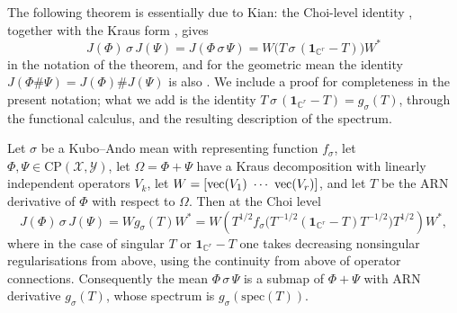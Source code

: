 The following theorem is essentially due to Kian: the Choi-level identity \cite[Theorem~5.1]{kian2026relative}, together with the Kraus form \cite[Proposition~3.13]{kian2026relative}, gives
\[
J(\Phi)\,\sigma\,J(\Psi)=J(\Phi\,\sigma\,\Psi)=W\big(T\,\sigma\,(\mathbf{1}_{\mathbb{C}^r}-T)\big)W^*
\]
in the notation of the theorem, and for the geometric mean the identity $J(\Phi\#\Psi)=J(\Phi)\#J(\Psi)$ is also \cite[Proposition~4.1]{Okayasu2026}. We include a proof for completeness in the present notation; what we add is the identity $T\,\sigma\,(\mathbf{1}_{\mathbb{C}^r}-T)=g_\sigma(T)$, through the functional calculus, and the resulting description of the spectrum.
 
\begin{theorem}\label{cont:fundamental principle}
    Let $\sigma$ be a Kubo--Ando mean with representing function $f_\sigma$, let $\Phi,\Psi\in\mathrm{CP}(\mathcal{X},\mathcal{Y})$, let $\Omega=\Phi+\Psi$ have a Kraus decomposition with linearly independent operators $V_k$, let $W=[\vectorise(V_1)\ \cdots\ \vectorise(V_r)]$, and let $T$ be the ARN derivative of $\Phi$ with respect to $\Omega$. Then at the Choi level
    \[
        J(\Phi)\,\sigma\,J(\Psi)=Wg_{\sigma}(T)W^*=W\left(T^{1/2}f_\sigma\big(T^{-1/2}(\mathbf{1}_{\mathbb{C}^r}-T)T^{-1/2}\big)T^{1/2}\right)W^*,
    \]
    where in the case of singular $T$ or $\mathbf{1}_{\mathbb{C}^r}-T$ one takes decreasing nonsingular regularisations from above, using the continuity from above of operator connections. Consequently the mean $\Phi\,\sigma\,\Psi$ is a submap of $\Phi+\Psi$ with ARN derivative $g_\sigma(T)$, whose spectrum is $g_\sigma(\mathrm{spec}(T))$.
\end{theorem}
